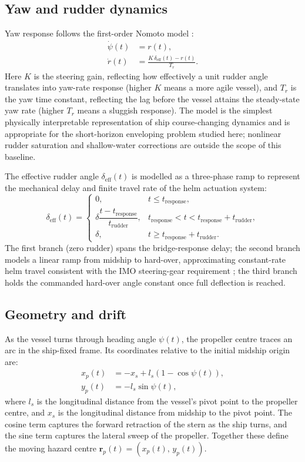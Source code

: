 \documentclass[preprint,12pt]{elsarticle}
\begin{document}
\subsection{Yaw and rudder dynamics}
Yaw response follows the first-order Nomoto model \cite{ref_fossen}:
\begin{align}
\dot{\psi}(t) &= r(t),\\
\dot{r}(t) &= \frac{K\,\delta_{\mathrm{eff}}(t)-r(t)}{T_r}.
\end{align}
Here $K$ is the steering gain, reflecting how effectively a unit rudder angle translates into yaw-rate response (higher $K$ means a more agile vessel), and $T_r$ is the yaw time constant, reflecting the lag before the vessel attains the steady-state yaw rate (higher $T_r$ means a sluggish response). The model is the simplest physically interpretable representation of ship course-changing dynamics and is appropriate for the short-horizon enveloping problem studied here; nonlinear rudder saturation and shallow-water corrections are outside the scope of this baseline.

The effective rudder angle $\delta_{\mathrm{eff}}(t)$ is modelled as a three-phase ramp to represent the mechanical delay and finite travel rate of the helm actuation system:
\begin{equation}
\delta_{\mathrm{eff}}(t)=
\begin{cases}
0, & t\le t_{\mathrm{response}},\\
\delta\dfrac{t-t_{\mathrm{response}}}{t_{\mathrm{rudder}}}, & t_{\mathrm{response}}<t<t_{\mathrm{response}}+t_{\mathrm{rudder}},\\
\delta, & t\ge t_{\mathrm{response}}+t_{\mathrm{rudder}}.
\end{cases}
\end{equation}
The first branch (zero rudder) spans the bridge-response delay; the second branch models a linear ramp from midship to hard-over, approximating constant-rate helm travel consistent with the IMO steering-gear requirement \cite{ref_solas}; the third branch holds the commanded hard-over angle constant once full deflection is reached.

\subsection{Geometry and drift}
As the vessel turns through heading angle $\psi(t)$, the propeller centre traces an arc in the ship-fixed frame. Its coordinates relative to the initial midship origin are:
\begin{align}
 x_p(t) &= -x_s + l_s\left(1-\cos\psi(t)\right),\\
 y_p(t) &= -l_s\sin\psi(t),
\end{align}
where $l_s$ is the longitudinal distance from the vessel's pivot point to the propeller centre, and $x_s$ is the longitudinal distance from midship to the pivot point. The cosine term captures the forward retraction of the stern as the ship turns, and the sine term captures the lateral sweep of the propeller. Together these define the moving hazard centre $\mathbf{r}_p(t)=(x_p(t),\,y_p(t))$.
\end{document}
